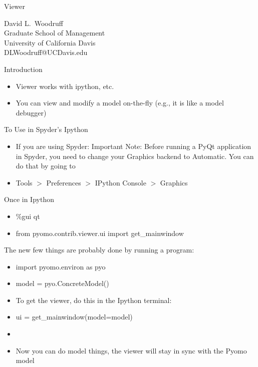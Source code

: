 \documentclass{beamer}
\begin{document}
\begin{frame}{}

\begin{center}
\begin{Large}
Viewer 
\end{Large}
$\mbox{ }$\\
David L.\ Woodruff\\
Graduate School of Management\\
University of California Davis\\
DLWoodruff@UCDavis.edu\\
\end{center}
\end{frame}

\begin{frame}{Introduction}
  \begin{itemize}
  \item Viewer works with ipython, etc.
  \item You can view and modify a model on-the-fly (e.g., it is like a model debugger)
  \end{itemize}
\end{frame}

\begin{frame}{To Use in Spyder's Ipython}
\begin{itemize}
 \item[] If you are using Spyder: Important Note: Before running a PyQt application in Spyder, you need to change your Graphics backend to Automatic. You can do that by going to
\item [] Tools $>$ Preferences $>$ IPython Console $>$ Graphics
\end{itemize}
\end{frame}

\begin{frame}{Once in Ipython}
\subtitle{From the Viewer readme}

\begin{itemize}
\item \%gui qt 
\item from pyomo.contrib.viewer.ui import get\_mainwindow
\end{itemize}

The new few things are probably done by running a program:
\begin{itemize}
\item[] import pyomo.environ as pyo
\item[] model = pyo.ConcreteModel()
\end{itemize}

\begin{itemize}
\item[] To get the viewer, do this in the Ipython terminal:
\item ui = get\_mainwindow(model=model)
\item[]
\item []Now you can do model things, the viewer will stay in sync with the Pyomo model
\end{itemize}
\end{frame}
\end{document}
